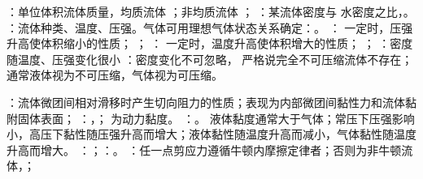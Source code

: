 ：单位体积流体质量，均质流体 %
；非均质流体 ；
：某流体密度与  水密度之比，。
：流体种类、温度、压强。气体可用理想气体状态关系确定：。
： 一定时，压强升高使体积缩小的性质； ；%
： 一定时，温度升高使体积增大的性质； ；%
：密度随温度、压强变化很小%
：密度变化不可忽略，%
严格说完全不可压缩流体不存在；通常液体视为不可压缩，气体视为可压缩。

：流体微团间相对滑移时产生切向阻力的性质；表现为内部微团间黏性力和流体黏附固体表面；
：，；\m{\mu} 为动力黏度。%
：\m{\nu=\frac{\mu}{\rho}}。%
液体黏度通常大于气体；常压下压强影响小，高压下黏性随压强升高而增大；液体黏性随温度升高而减小，气体黏性随温度升高而增大。
：；：。%
：任一点剪应力遵循牛顿内摩擦定律者；否则为非牛顿流体，；

